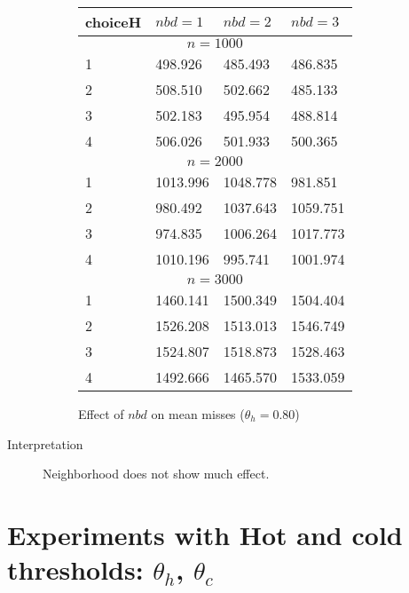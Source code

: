\documentclass[11pt,a4paper,draft]{article}
\begin{document}
\begin{description}
	\begin{figure}[!h]
		\centering
		\begin{tabular}{llll}
			\hline \hline
			choiceH & $nbd = 1$ & $nbd = 2$ & $nbd = 3$ \\
			\hline \hline 
			\multicolumn{4}{c}{$n = 1000$} \\ 
			\hline
			1 & 498.926 & 485.493 & 486.835 \\
			2 & 508.510 & 502.662 & 485.133 \\
			3 & 502.183 & 495.954 & 488.814 \\
			4 & 506.026 & 501.933 & 500.365 \\
			\hline
			\multicolumn{4}{c}{$n = 2000$} \\ 
			\hline
			1 & 1013.996 & 1048.778 & 981.851 \\
			2 & 980.492 & 1037.643 & 1059.751 \\
			3 & 974.835 & 1006.264 & 1017.773 \\
			4 & 1010.196 & 995.741 & 1001.974 \\
			\hline
			\multicolumn{4}{c}{$n = 3000$} \\
			\hline
			1 & 1460.141 & 1500.349 & 1504.404 \\
			2 & 1526.208 & 1513.013 & 1546.749 \\
			3 & 1524.807 & 1518.873 & 1528.463 \\
			4 & 1492.666 & 1465.570 & 1533.059 \\
			\hline 
		\end{tabular}
		\caption{Effect of $nbd$ on mean misses ($\theta_h = 0.80$)}
	\end{figure}
	\pagebreak
	
	\item[Interpretation] Neighborhood does not show much effect.
\end{description}

\section{Experiments with Hot and cold thresholds: $\theta_h$, $\theta_c$}
\end{document}
